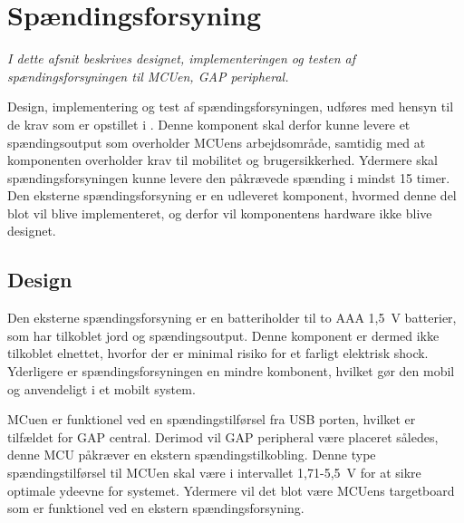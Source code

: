 \section{Spændingsforsyning}
\textit{I dette afsnit beskrives designet, implementeringen og testen af spændingsforsyningen til MCUen, GAP peripheral.}

Design, implementering og test af spændingsforsyningen, udføres med hensyn til de krav som er opstillet i . \newline
Denne komponent skal derfor kunne levere et spændingsoutput som overholder MCUens arbejdsområde, samtidig med at komponenten overholder krav til mobilitet og brugersikkerhed. Ydermere skal spændingsforsyningen kunne levere den påkrævede spænding i mindst 15 timer. \newline
Den eksterne spændingsforsyning er en udleveret komponent, hvormed denne del blot vil blive implementeret, og derfor vil komponentens hardware ikke blive designet.


\subsection{Design}
Den eksterne spændingsforsyning er en batteriholder til to AAA 1,5~V batterier, som har tilkoblet jord og spændingsoutput. Denne komponent er dermed ikke tilkoblet elnettet, hvorfor der er minimal risiko for et farligt elektrisk shock. Yderligere er spændingsforsyningen en mindre kombonent, hvilket gør den mobil og anvendeligt i et mobilt system.

MCuen er funktionel ved en spændingstilførsel fra USB porten, hvilket er tilfældet for GAP central. Derimod vil GAP peripheral være placeret således, denne MCU påkræver en ekstern spændingstilkobling. Denne type spændingstilførsel til MCUen skal være i intervallet 1,71-5,5~V for at sikre optimale ydeevne for systemet. Ydermere vil det blot være MCUens targetboard som er funktionel ved en ekstern spændingsforsyning.

